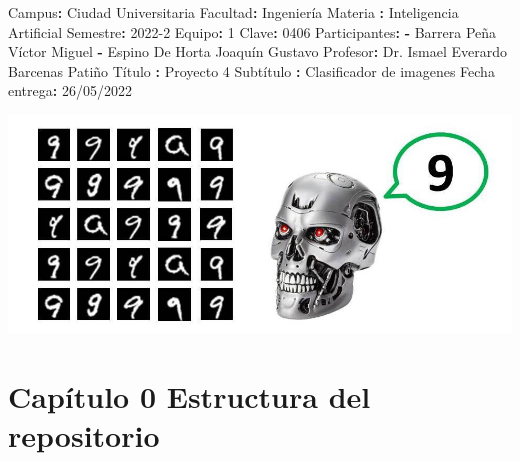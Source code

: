\documentclass[
  spanish,
]{article}
\author{}
\date{}
\newenvironment{Shaded}{}{}
\newcommand{\AttributeTok}[1]{\textcolor[rgb]{0.49,0.56,0.16}{#1}}
\newcommand{\DecValTok}[1]{\textcolor[rgb]{0.25,0.63,0.44}{#1}}
\newcommand{\FunctionTok}[1]{\textcolor[rgb]{0.02,0.16,0.49}{#1}}
\newcommand{\KeywordTok}[1]{\textcolor[rgb]{0.00,0.44,0.13}{\textbf{#1}}}
\begin{document}
\begin{Shaded}
\begin{Highlighting}[]
\FunctionTok{Campus}\KeywordTok{:}\AttributeTok{ Ciudad Universitaria}
\FunctionTok{Facultad}\KeywordTok{:}\AttributeTok{ Ingeniería}
\FunctionTok{Materia }\KeywordTok{:}\AttributeTok{ Inteligencia Artificial}
\FunctionTok{Semestre}\KeywordTok{:}\AttributeTok{ 2022{-}2}
\FunctionTok{Equipo}\KeywordTok{:}\AttributeTok{ }\DecValTok{1}
\FunctionTok{Clave}\KeywordTok{:}\AttributeTok{ }\DecValTok{0406}
\FunctionTok{Participantes}\KeywordTok{:}\AttributeTok{ }
\KeywordTok{{-}}\AttributeTok{ Barrera Peña Víctor Miguel}
\KeywordTok{{-}}\AttributeTok{ Espino De Horta Joaquín Gustavo}
\AttributeTok{    }
\FunctionTok{Profesor}\KeywordTok{:}\AttributeTok{ Dr. Ismael Everardo Barcenas Patiño}
\FunctionTok{Título }\KeywordTok{:}\AttributeTok{ Proyecto 4}
\FunctionTok{Subtítulo }\KeywordTok{:}\AttributeTok{ Clasificador de imagenes}
\FunctionTok{Fecha entrega}\KeywordTok{:}\AttributeTok{ 26/05/2022}
\end{Highlighting}
\end{Shaded}

\includegraphics[width=1.1\textwidth,height=\textheight]{img/README/portada.jpeg}

\pagebreak

\hypertarget{capuxedtulo-0-estructura-del-repositorio}{%
\section{Capítulo 0 Estructura del
repositorio}\label{capuxedtulo-0-estructura-del-repositorio}}
\end{document}
